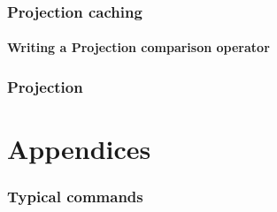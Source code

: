\documentclass{JHEP3}
\begin{document}
\section{Projection caching}

\subsection{Writing a Projection comparison operator}

\section{Projection }


\cleardoublepage
\part{Appendices}
\appendix


\section{Typical  commands}
\label{app:agilerunmc}
\end{document}
